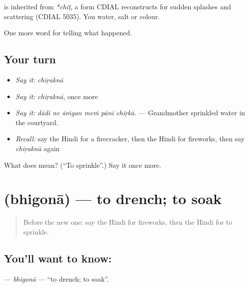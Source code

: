 \begin{cousinweb}
is inherited from \emph{*chiṭ}, a form CDIAL reconstructs for sudden splashes and scattering (CDIAL 5035). You \textbf{} water, salt or colour.
\end{cousinweb}

\begin{grammarlens}[title={What you've built}]
One more word for telling what happened.
\end{grammarlens}

\subsection*{Your turn}
\begin{itemize}
\raggedright
  \item \emph{Say it:} \emph{chiṛaknā}
  \item \emph{Say it:} \emph{chiṛaknā}, once more
  \item \emph{Say it:} \emph{dādī ne āṁgan meṁ pānī chiṛkā.} — Grandmother sprinkled water in the courtyard.
  \item \emph{Recall:} say the Hindi for a firecracker, then the Hindi for fireworks, then say \emph{chiṛaknā} again
\end{itemize}

\begin{tcolorbox}[breakable,colback=teal!4,colframe=teal!35!black,title={Before you move on}]
What does  mean? (\textquotedblleft{}To sprinkle\textquotedblright{}.) Say it once more.
\end{tcolorbox}
\section[\texorpdfstring{\hi{भिगोना} (bhigonā)}{भिगोना (bhigonā)}]{ (bhigonā) — to drench; to soak}

\label{lesson:HI-C329-bhigona}



\begin{quote}
Before the new one: say the Hindi for fireworks, then the Hindi for to sprinkle.
\end{quote}

\subsection*{You'll want to know: }
\textbf{} — \emph{bhigonā} — \textquotedblleft{}to drench; to soak\textquotedblright{}.

